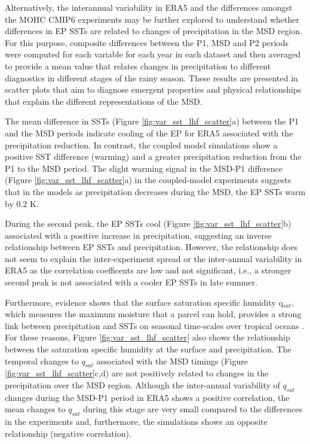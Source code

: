Alternatively, the interannual variability in ERA5 and the differences amongst the MOHC CMIP6 experiments may be further explored to understand whether differences in EP SSTs are related to changes of precipitation in the MSD region. For this purpose, composite differences between the P1, MSD and P2 periods were computed for each variable for each year in each dataset and then averaged to provide a mean value that relates changes in precipitation to different diagnostics in different stages of the rainy season.  These results are presented in scatter plots that aim to diagnose emergent properties and physical relationships that explain the different representations of the MSD. %

The mean difference in SSTs (Figure \ref{fig:var_sst_lhf_scatter}a) between the P1 and the MSD periods indicate cooling of the EP for ERA5 associated with the precipitation reduction. In contrast, the coupled model simulations show a positive SST difference (warming) and a greater precipitation reduction from the P1 to the MSD period.
The slight warming signal in the MSD-P1 difference (Figure \ref{fig:var_sst_lhf_scatter}a) in the coupled-model experiments suggests that in the models as precipitation decreases during the MSD, the EP SSTs warm by 0.2 K. 

During the second peak, the EP SSTs cool (Figure \ref{fig:var_sst_lhf_scatter}b) associated with a positive increase in precipitation, suggesting an inverse relationship between EP SSTs and precipitation. However, the relationship does not seem to explain the inter-experiment spread or the inter-annual variability in ERA5 as the correlation coefficents are low and not significant, i.e., a stronger second peak is not associated with a cooler EP SSTs in late summer. 


Furthermore, evidence shows that the surface saturation specific humidity q$_{sat}$, which measures the maximum moisture that a parcel can hold, provides a strong link between precipitation and SSTs on seasonal time-scales over tropical oceans \citep{yang2019,good2021}. For these reasons, Figure \ref{fig:var_sst_lhf_scatter} also shows the relationship between the saturation specific humidity at the surface and precipitation. The temporal changes to $q_{sat}$ associated with the MSD timings (Figure \ref{fig:var_sst_lhf_scatter}c,d) are not positively related to changes in the precipitation over the MSD region. Although the inter-annual variability of $q_{sat}$ changes during the MSD-P1  period in ERA5 shows a positive correlation, the mean changes to $q_{sat}$ during this stage are very small compared to the differences in the experiments and, furthermore, the simulations shows an opposite relationship (negative correlation). 

